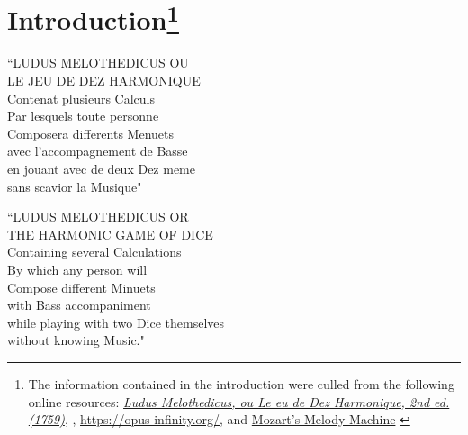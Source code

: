 \documentclass[a4paper,x11names,svgnames,10pt]{article}
\begin{document}
{\section[Introduction]{Introduction\footnote{The information contained in the introduction were culled from the following online resources:
		\href{https://imslp.org/wiki/Ludus_Melothedicus_(Anonymous)}{\it Ludus Melothedicus, ou Le eu de Dez Harmonique, 2nd ed. (1759)}, 
		\citet{wiki_mw2017},
		\url{https://opus-infinity.org/}, and 
		\href{https://www.sciencenews.org/article/mozarts-melody-machine-0}{Mozart's Melody Machine} \citep*{peterson2001}
	}
}
\begin{center}
	\begin{minipage}{0.4\textwidth}
		\begin{flushleft}
			\begin{center}
				``\small LUDUS MELOTHEDICUS OU \\ LE JEU DE DEZ HARMONIQUE \\
				Contenat plusieurs Calculs \\
				Par lesquels toute personne \\ Composera differents Menuets \\ 
				avec l'accompagnement de Basse  \\
				en jouant avec de deux Dez meme  \\
				sans scavior la Musique"
			\end{center}
		\end{flushleft}
	\end{minipage}
	\begin{minipage}{0.4\textwidth}
		\begin{flushright}
			\begin{center}
				``\small LUDUS MELOTHEDICUS OR \\ THE HARMONIC GAME OF DICE \\
				Containing several Calculations \\ 
				By which any person will \\
				Compose different Minuets \\ 
				with Bass accompaniment \\
				while playing with two Dice themselves \\ 
				without knowing Music."
			\end{center}
		\end{flushright}
	\end{minipage}
\end{center}

}
\end{document}
